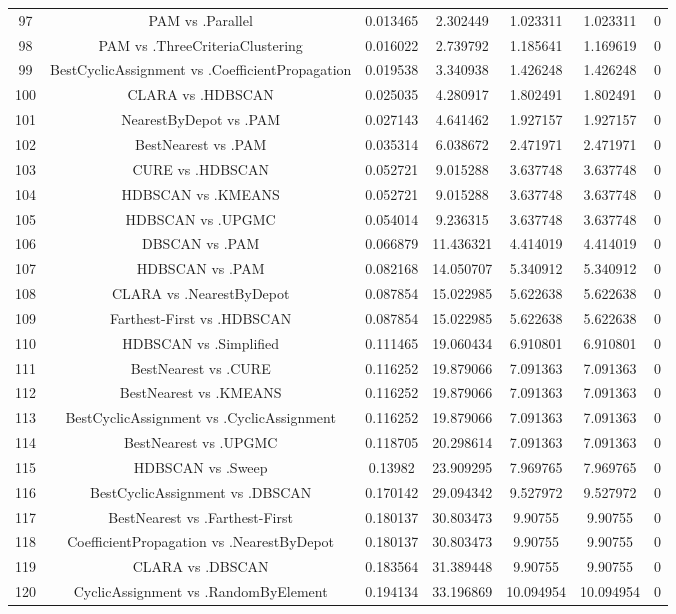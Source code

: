 \documentclass[a4paper,10pt]{article}
\begin{document}
\begin{landscape}
\begin{table}[!htp]
\begin{tabular}{ccccccc}
97&PAM vs .Parallel&0.013465&2.302449&1.023311&1.023311&0\\
98&PAM vs .ThreeCriteriaClustering&0.016022&2.739792&1.185641&1.169619&0\\
99&BestCyclicAssignment vs .CoefficientPropagation&0.019538&3.340938&1.426248&1.426248&0\\
100&CLARA vs .HDBSCAN&0.025035&4.280917&1.802491&1.802491&0\\
101&NearestByDepot vs .PAM&0.027143&4.641462&1.927157&1.927157&0\\
102&BestNearest vs .PAM&0.035314&6.038672&2.471971&2.471971&0\\
103&CURE vs .HDBSCAN&0.052721&9.015288&3.637748&3.637748&0\\
104&HDBSCAN vs .KMEANS&0.052721&9.015288&3.637748&3.637748&0\\
105&HDBSCAN vs .UPGMC&0.054014&9.236315&3.637748&3.637748&0\\
106&DBSCAN vs .PAM&0.066879&11.436321&4.414019&4.414019&0\\
107&HDBSCAN vs .PAM&0.082168&14.050707&5.340912&5.340912&0\\
108&CLARA vs .NearestByDepot&0.087854&15.022985&5.622638&5.622638&0\\
109&Farthest-First vs .HDBSCAN&0.087854&15.022985&5.622638&5.622638&0\\
110&HDBSCAN vs .Simplified&0.111465&19.060434&6.910801&6.910801&0\\
111&BestNearest vs .CURE&0.116252&19.879066&7.091363&7.091363&0\\
112&BestNearest vs .KMEANS&0.116252&19.879066&7.091363&7.091363&0\\
113&BestCyclicAssignment vs .CyclicAssignment&0.116252&19.879066&7.091363&7.091363&0\\
114&BestNearest vs .UPGMC&0.118705&20.298614&7.091363&7.091363&0\\
115&HDBSCAN vs .Sweep&0.13982&23.909295&7.969765&7.969765&0\\
116&BestCyclicAssignment vs .DBSCAN&0.170142&29.094342&9.527972&9.527972&0\\
117&BestNearest vs .Farthest-First&0.180137&30.803473&9.90755&9.90755&0\\
118&CoefficientPropagation vs .NearestByDepot&0.180137&30.803473&9.90755&9.90755&0\\
119&CLARA vs .DBSCAN&0.183564&31.389448&9.90755&9.90755&0\\
120&CyclicAssignment vs .RandomByElement&0.194134&33.196869&10.094954&10.094954&0\\

\end{tabular}
\end{table}
\end{landscape}
\end{document}
